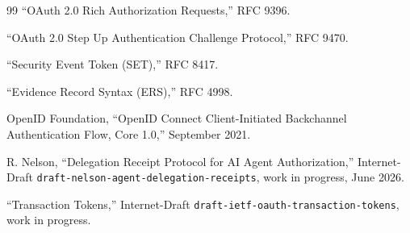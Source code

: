 \documentclass[11pt]{article}
\newcommand{\code}[1]{\texttt{#1}}
\begin{document}
\begin{thebibliography}{99}
 ``OAuth 2.0 Rich Authorization Requests,'' RFC 9396.

 ``OAuth 2.0 Step Up Authentication Challenge Protocol,'' RFC 9470.

 ``Security Event Token (SET),'' RFC 8417.

 ``Evidence Record Syntax (ERS),'' RFC 4998.

 OpenID Foundation, ``OpenID Connect Client-Initiated Backchannel
Authentication Flow, Core 1.0,'' September 2021.

 R. Nelson, ``Delegation Receipt Protocol for AI Agent
Authorization,'' Internet-Draft \code{draft-nelson-agent-delegation-receipts}, work
in progress, June 2026.

 ``Transaction Tokens,'' Internet-Draft
\code{draft-ietf-oauth-transaction-tokens}, work in progress.

\end{thebibliography}
\end{document}
